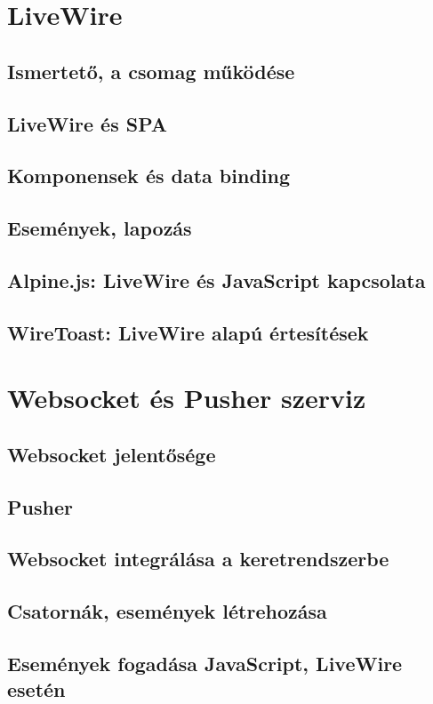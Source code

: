 \documentclass[
]{thesis-ekf}
\theoremstyle{definition}
\theoremstyle{remark}
\begin{document}
\section{LiveWire}
\subsection{Ismertető, a csomag működése}
\subsection{LiveWire és SPA}
\subsection{Komponensek és data binding}
\subsection{Események, lapozás}
\subsection{Alpine.js: LiveWire és JavaScript kapcsolata}
\subsection{WireToast: LiveWire alapú értesítések}

\section{Websocket és Pusher szerviz}
\subsection{Websocket jelentősége}
\subsection{Pusher}
\subsection{Websocket integrálása a keretrendszerbe}
\subsection{Csatornák, események létrehozása}
\subsection{Események fogadása JavaScript, LiveWire esetén}
\end{document}
